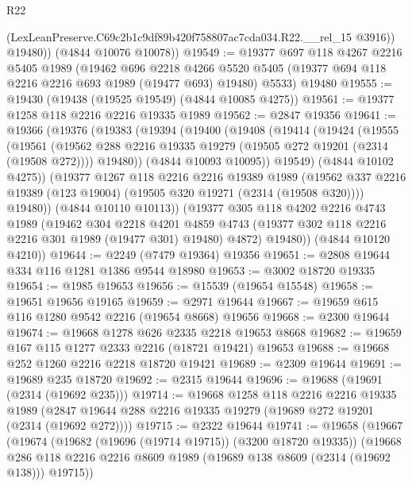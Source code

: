 \begin{lexlean}{R22}
\begin{coremodule}
            (LexLeanPreserve.C69c2b1c9df89b420f758807ac7cda034.R22.__rel_15 @3916))
          @19480))
      (@4844 @10076 @10078))
@19549 := @19377
    @697
    @118
    @4267
    @2216
    @5405
    @1989
    (@19462
      @696
      @2218
      @4266
      @5520
      @5405
      (@19377 @694 @118 @2216 @2216 @693 @1989 (@19477 @693) @19480)
      @5533)
    @19480
@19555 := @19430 (@19438 (@19525 @19549) (@4844 @10085 @4275))
@19561 := @19377 @1258 @118 @2216 @2216 @19335 @1989
@19562 := @2847 @19356
@19641 := @19366
    (@19376
      (@19383
        (@19394
          (@19400
            (@19408
              (@19414
                (@19424
                  (@19555
                    (@19561
                      (@19562 @288 @2216 @19335 @19279 (@19505 @272 @19201 (@2314 (@19508 @272))))
                      @19480))
                  (@4844 @10093 @10095))
                @19549)
              (@4844 @10102 @4275))
            (@19377
              @1267
              @118
              @2216
              @2216
              @19389
              @1989
              (@19562 @337 @2216 @19389 (@123 @19004) (@19505 @320 @19271 (@2314 (@19508 @320))))
              @19480))
          (@4844 @10110 @10113))
        (@19377
          @305
          @118
          @4202
          @2216
          @4743
          @1989
          (@19462
            @304
            @2218
            @4201
            @4859
            @4743
            (@19377 @302 @118 @2216 @2216 @301 @1989 (@19477 @301) @19480)
            @4872)
          @19480))
      (@4844 @10120 @4210))
@19644 := @2249 (@7479 @19364) @19356
@19651 := @2808 @19644 @334 @116 @1281 @1386 @9544 @18980
@19653 := @3002 @18720 @19335
@19654 := @1985 @19653
@19656 := @15539 (@19654 @15548)
@19658 := @19651 @19656 @19165
@19659 := @2971 @19644
@19667 := @19659 @615 @116 @1280 @9542 @2216 (@19654 @8668) @19656
@19668 := @2300 @19644
@19674 := @19668 @1278 @626 @2335 @2218 @19653 @8668
@19682 := @19659 @167 @115 @1277 @2333 @2216 (@18721 @19421) @19653
@19688 := @19668 @252 @1260 @2216 @2218 @18720 @19421
@19689 := @2309 @19644
@19691 := @19689 @235 @18720
@19692 := @2315 @19644
@19696 := @19688 (@19691 (@2314 (@19692 @235)))
@19714 := @19668
    @1258
    @118
    @2216
    @2216
    @19335
    @1989
    (@2847 @19644 @288 @2216 @19335 @19279 (@19689 @272 @19201 (@2314 (@19692 @272))))
@19715 := @2322 @19644
@19741 := @19658
    (@19667
      (@19674
        (@19682 (@19696 (@19714 @19715)) (@3200 @18720 @19335))
        (@19668 @286 @118 @2216 @2216 @8609 @1989 (@19689 @138 @8609 (@2314 (@19692 @138))) @19715))

\end{coremodule}
\end{lexlean}
